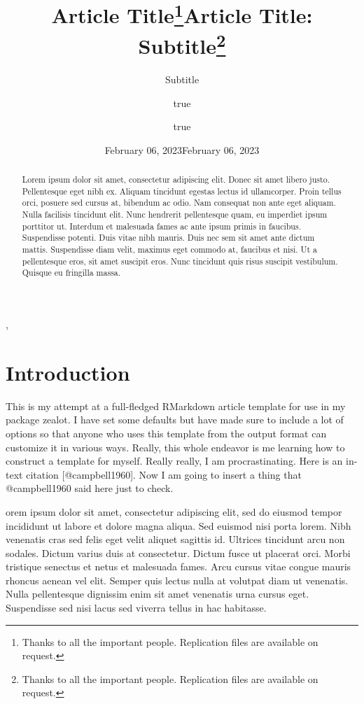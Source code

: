 \documentclass[
  11pt,
  twocolumn,
  twoside]{article}
\title{Article Title\thanks{Thanks to all the important people.
Replication files are available on request.}}
\subtitle{Subtitle}
\author{true \and true}
\date{February 06, 2023}
\begin{document}
{\setlength{\droptitle}{-4\baselineskip} %

\title{Article Title: Subtitle\thanks{Thanks to all the important
people. Replication files are available on request.}  }

\maketitle

\author{\textsc{}},
\normalsize{}

\date{February 06, 2023}

\begin{abstract}
\noindent Lorem ipsum dolor sit amet, consectetur adipiscing elit. Donec
sit amet libero justo. Pellentesque eget nibh ex. Aliquam tincidunt
egestas lectus id ullamcorper. Proin tellus orci, posuere sed cursus at,
bibendum ac odio. Nam consequat non ante eget aliquam. Nulla facilisis
tincidunt elit. Nunc hendrerit pellentesque quam, eu imperdiet ipsum
porttitor ut. Interdum et malesuada fames ac ante ipsum primis in
faucibus. Suspendisse potenti. Duis vitae nibh mauris. Duis nec sem sit
amet ante dictum mattis. Suspendisse diam velit, maximus eget commodo
at, faucibus et nisi. Ut a pellentesque eros, sit amet suscipit eros.
Nunc tincidunt quis risus suscipit vestibulum. Quisque eu fringilla
massa.
\end{abstract}

}




\hypertarget{introduction}{%
\section{Introduction}\label{introduction}}

This is my attempt at a full-fledged RMarkdown article template for use
in my package zealot. I have set some defaults but have made sure to
include a lot of options so that anyone who uses this template from the
output format can customize it in various ways. Really, this whole
endeavor is me learning how to construct a template for myself. Really
really, I am procrastinating. Here is an in-text citation
{[}@campbell1960{]}. Now I am going to insert a thing that @campbell1960
said here just to check.

orem ipsum dolor sit amet, consectetur adipiscing elit, sed do eiusmod
tempor incididunt ut labore et dolore magna aliqua. Sed euismod nisi
porta lorem. Nibh venenatis cras sed felis eget velit aliquet sagittis
id. Ultrices tincidunt arcu non sodales. Dictum varius duis at
consectetur. Dictum fusce ut placerat orci. Morbi tristique senectus et
netus et malesuada fames. Arcu cursus vitae congue mauris rhoncus aenean
vel elit. Semper quis lectus nulla at volutpat diam ut venenatis. Nulla
pellentesque dignissim enim sit amet venenatis urna cursus eget.
Suspendisse sed nisi lacus sed viverra tellus in hac habitasse.
\end{document}
